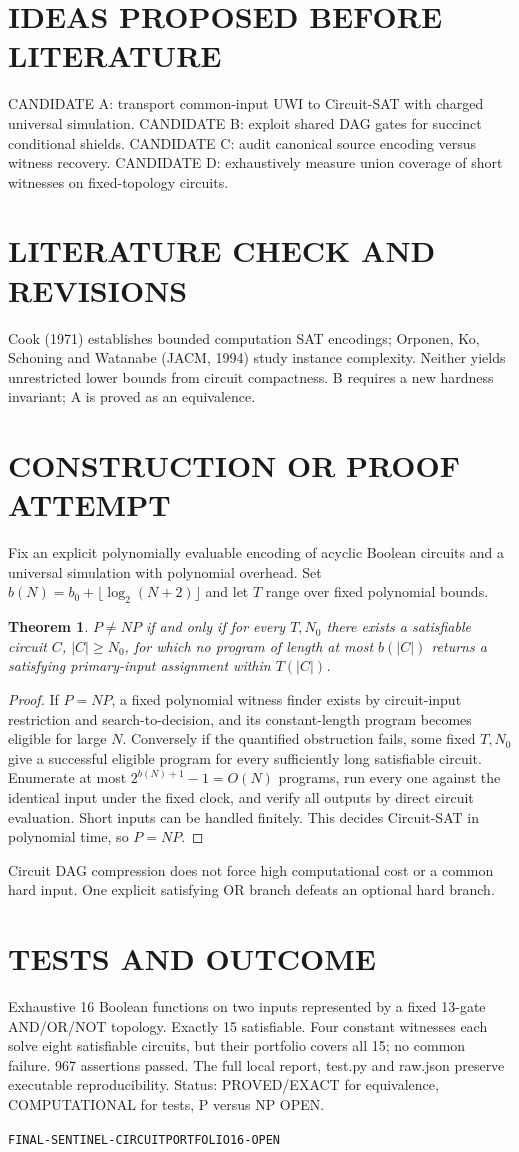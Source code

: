 \documentclass{article}
\newtheorem{theorem}{Theorem}
\begin{document}
\section{IDEAS PROPOSED BEFORE LITERATURE}
CANDIDATE A: transport common-input UWI to Circuit-SAT with charged universal simulation. CANDIDATE B: exploit shared DAG gates for succinct conditional shields. CANDIDATE C: audit canonical source encoding versus witness recovery. CANDIDATE D: exhaustively measure union coverage of short witnesses on fixed-topology circuits.
\section{LITERATURE CHECK AND REVISIONS}
Cook (1971) establishes bounded computation SAT encodings; Orponen, Ko, Schoning and Watanabe (JACM, 1994) study instance complexity. Neither yields unrestricted lower bounds from circuit compactness. B requires a new hardness invariant; A is proved as an equivalence.
\section{CONSTRUCTION OR PROOF ATTEMPT}
Fix an explicit polynomially evaluable encoding of acyclic Boolean circuits and a universal simulation with polynomial overhead. Set $b(N)=b_0+\lfloor\log_2(N+2)\rfloor$ and let $T$ range over fixed polynomial bounds.
\begin{theorem}
$P\neq NP$ if and only if for every $T,N_0$ there exists a satisfiable circuit $C$, $|C|\ge N_0$, for which no program of length at most $b(|C|)$ returns a satisfying primary-input assignment within $T(|C|)$.
\end{theorem}
\begin{proof}
If $P=NP$, a fixed polynomial witness finder exists by circuit-input restriction and search-to-decision, and its constant-length program becomes eligible for large $N$. Conversely if the quantified obstruction fails, some fixed $T,N_0$ give a successful eligible program for every sufficiently long satisfiable circuit. Enumerate at most $2^{b(N)+1}-1=O(N)$ programs, run every one against the identical input under the fixed clock, and verify all outputs by direct circuit evaluation. Short inputs can be handled finitely. This decides Circuit-SAT in polynomial time, so $P=NP$.
\end{proof}
Circuit DAG compression does not force high computational cost or a common hard input. One explicit satisfying OR branch defeats an optional hard branch.
\section{TESTS AND OUTCOME}
Exhaustive 16 Boolean functions on two inputs represented by a fixed 13-gate AND/OR/NOT topology. Exactly 15 satisfiable. Four constant witnesses each solve eight satisfiable circuits, but their portfolio covers all 15; no common failure. 967 assertions passed. The full local report, test.py and raw.json preserve executable reproducibility. Status: PROVED/EXACT for equivalence, COMPUTATIONAL for tests, P versus NP OPEN.
\par\texttt{FINAL-SENTINEL-CIRCUITPORTFOLIO16-OPEN}
\end{document}

